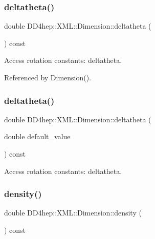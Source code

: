 \subsubsection{\texorpdfstring{deltatheta()}{deltatheta()}\hspace{0.1cm}{\footnotesize\ttfamily [1/2]}}
{\footnotesize\ttfamily double D\+D4hep\+::\+X\+M\+L\+::\+Dimension\+::deltatheta (\begin{DoxyParamCaption}{ }\end{DoxyParamCaption}) const}



Access rotation constants\+: deltatheta. 



Referenced by Dimension().

\hypertarget{struct_d_d4hep_1_1_x_m_l_1_1_dimension_a850b516752763ef8a1b39038dd0af32a}{}\label{struct_d_d4hep_1_1_x_m_l_1_1_dimension_a850b516752763ef8a1b39038dd0af32a} 
\subsubsection{\texorpdfstring{deltatheta()}{deltatheta()}\hspace{0.1cm}{\footnotesize\ttfamily [2/2]}}
{\footnotesize\ttfamily double D\+D4hep\+::\+X\+M\+L\+::\+Dimension\+::deltatheta (\begin{DoxyParamCaption}\item[{double}]{default\+\_\+value }\end{DoxyParamCaption}) const}



Access rotation constants\+: deltatheta. 

\hypertarget{struct_d_d4hep_1_1_x_m_l_1_1_dimension_a7d1bda3390c6e29327b06507fed0e5fd}{}\label{struct_d_d4hep_1_1_x_m_l_1_1_dimension_a7d1bda3390c6e29327b06507fed0e5fd} 
\subsubsection{\texorpdfstring{density()}{density()}\hspace{0.1cm}{\footnotesize\ttfamily [1/2]}}
{\footnotesize\ttfamily double D\+D4hep\+::\+X\+M\+L\+::\+Dimension\+::density (\begin{DoxyParamCaption}{ }\end{DoxyParamCaption}) const}



